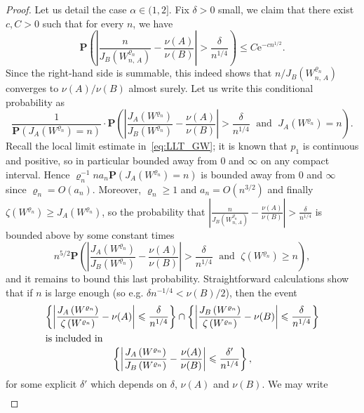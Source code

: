 \documentclass[AHL,Unicode,longabstracts,published]{cedram}
\newcommand{\ensembles}[1]{\mathbf{#1}}
\renewcommand{\P}{\ensembles{P}}
\renewcommand{\Pr}[1]{\P\left(#1\right)}
\newcommand{\1}{\ensembles{1}}
\renewcommand{\le}{\leqslant}
\renewcommand{\ge}{\geqslant}
\newcommand{\e}{\mathrm{e}}
\begin{document}
\begin{proof}
Let us detail the case $\alpha \in (1,2]$. Fix $\delta > 0$ small, we claim that there exist $c, C > 0$ such that for every $n$, we have
\begin{equation}\label{eq:concentration_feuilles}
\Pr{\left|\frac{n}{J_B\left(W^{\varrho_n}_{n,\,A}\right)}- \frac{\nu(A)}{\nu(B)}\right| > \frac{\delta}{n^{1/4}}} \le C \e^{- c n^{1/2}}.
\end{equation}
Since the right-hand side is summable, this indeed shows that $n / J_B(W^{\varrho_n}_{n,\,A})$ converges to $\nu(A) / \nu(B)$ almost surely. Let us write this conditional probability as
\[
\frac{1}{\P\left(J_A\left(W^{\varrho_n}\right) = n\right)} \cdot
\Pr{\left|\frac{J_A\left(W^{\varrho_n}\right)}{J_B\left(W^{\varrho_n}\right)}- \frac{\nu(A)}{\nu(B)}\right| > \frac{\delta}{n^{1/4}}\; \text{ and }\;J_A\left(W^{\varrho_n}\right) = n}.
\]
Recall the local limit estimate in~\eqref{eq:LLT_GW}; it is known that $p_1$ is continuous and positive, so in particular bounded away from $0$ and $\infty$ on any compact interval. Hence $\varrho_n^{-1} n a_n \P(J_A(W^{\varrho_n}) = n)$ is bounded away from $0$ and $\infty$ since $\varrho_n = O(a_n)$. Moreover, $\varrho_n \ge 1$ and $a_n = O(n^{3/2})$ and finally $\zeta(W^{\varrho_n}) \ge J_A(W^{\varrho_n})$, so the probability that $|\frac{n}{J_B(W^{\varrho_n}_{n,\,A})}- \frac{\nu(A)}{\nu(B)}| > \frac{\delta}{n^{1/4}}$ is bounded above by some constant times
\[
n^{5/2} \Pr{\left|\frac{J_A\left(W^{\varrho_n}\right)}{J_B\left(W^{\varrho_n}\right)}- \frac{\nu(A)}{\nu(B)}\right| > \frac{\delta}{n^{1/4}}\; \text{ and }\; \zeta\left(W^{\varrho_n}\right) \ge n},
\]
and it remains to bound this last probability. Straightforward calculations show that if $n$ is large enough (so e.g. $\delta n^{-1/4} < \nu(B) / 2$), then the event
\begin{gather*}
\left\{\left|\frac{J_A\left(W^{\varrho_n}\right)}{\zeta\left(W^{\varrho_n}\right)} - \nu(A)\right| \le \frac{\delta}{n^{1/4}}\right\}
\cap \left\{\left|\frac{J_B\left(W^{\varrho_n}\right)}{\zeta\left(W^{\varrho_n}\right)} - \nu(B)\right| \le \frac{\delta}{n^{1/4}}\right\}
\\
\intertext{is included in}
\left\{\left|\frac{J_A\left(W^{\varrho_n}\right)}{J_B\left(W^{\varrho_n}\right)} - \frac{\nu(A)}{\nu(B)}\right| \le \frac{\delta'}{n^{1/4}}\right\},
\end{gather*}
for some explicit $\delta'$ which depends on $\delta$, $\nu(A)$ and $\nu(B)$. We may write
\begin{multline*}

\end{multline*}
\end{proof}
\end{document}
